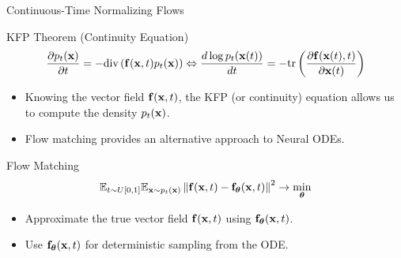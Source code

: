 \documentclass{beamer}
\begin{document}
\begin{frame}{Continuous-Time Normalizing Flows}
	\begin{block}{KFP Theorem (Continuity Equation)}
		\vspace{-0.5cm}
		\[
			\frac{\partial p_t(\mathbf{x})}{\partial t} = - \text{div}\left(\mathbf{f}(\mathbf{x}, t) p_t(\mathbf{x})\right) \Leftrightarrow \frac{d \log p_t(\mathbf{x}(t))}{d t} = - \text{tr} \left( \frac{\partial \mathbf{f}(\mathbf{x}(t), t)}{\partial \mathbf{x}(t)} \right)
		\]
		\vspace{-0.3cm}
	\end{block}
	\begin{itemize}
		\item Knowing the vector field $\mathbf{f} (\mathbf{x}, t)$, the KFP (or continuity) equation allows us to compute the density $p_t(\mathbf{x})$.
		\item Flow matching provides an alternative approach to Neural ODEs.
	\end{itemize}
    \eqpause
	\begin{block}{Flow Matching}
		\vspace{-0.3cm}
		\[
			\mathbb{E}_{t \sim U[0, 1]} \mathbb{E}_{\mathbf{x} \sim p_t(\mathbf{x})}\left\| \mathbf{f}(\mathbf{x}, t) - \mathbf{f}_{\boldsymbol{\theta}}(\mathbf{x}, t) \right\|^2 \rightarrow \min_{\boldsymbol{\theta}}
		\]
		\vspace{-0.3cm}
	\end{block}
    \eqpause
	\begin{itemize}
		\item Approximate the true vector field $\mathbf{f} (\mathbf{x}, t)$ using $\mathbf{f}_{\boldsymbol{\theta}}(\mathbf{x}, t)$.
		\item Use $\mathbf{f}_{\boldsymbol{\theta}}(\mathbf{x}, t)$ for deterministic sampling from the ODE.
	\end{itemize}
\end{frame}
\end{document}
